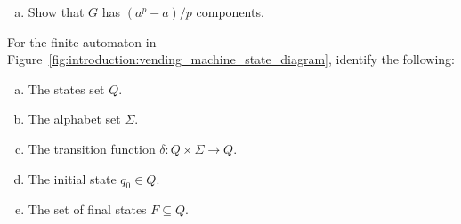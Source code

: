\begin{problem}
\begin{enumerate}[(a)]
  \item Show that $G$ has $(a^p - a) / p$ components.
  \end{enumerate}

\item For the finite automaton in
  Figure~\ref{fig:introduction:vending_machine_state_diagram},
  identify the following:
  \begin{enumerate}[(a)]
  \item The states set $Q$.

  \item The alphabet set $\Sigma$.

  \item The transition function $\delta: Q \times \Sigma \to Q$.

  \item The initial state $q_0 \in Q$.

  \item The set of final states $F \subseteq Q$.
  \end{enumerate}
\end{problem}
